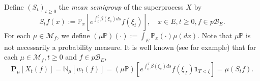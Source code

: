 \documentclass[UTF8]{pkuthss}
\theoremstyle{plain}
\theoremstyle{definition}
\numberwithin{equation}{section}
\begin{document}
	Define $(S_t)_{t \geq 0}$ the \emph{mean semigroup} of the superprocess $X$ by
\begin{equation}
\label{eq: mean semigroup}
	S_t f(x)
	:= \mathbb P_x[e^{\int_0^t \beta(\xi_s) ds} f(\xi_t)],
	\quad x \in E,t \geq 0,f \in p\mathscr B_E.
\end{equation}
	For each $\mu \in \mathcal M_f$, we define $ (\mu\mathbb P)(\cdot):= \int_E \mathbb P_x(\cdot)\mu(dx)$.
	Note that $\mu\mathbb P$ is not necessarily a probability measure.
	It is well known (see \cite[Proposition 2.27]{Li2011Measure-valued} for example) that for each $\mu \in \mathcal M_f, t \geq 0$ and $f \in p\mathscr B_E,$
\begin{equation}
\label{eq: mean formula}
	\mathbf P_\mu[X_t(f)]
	= \mathbb N_\mu[w_t(f)]
	= (\mu\mathbb P)[e^{\int_0^T \beta(\xi_s)ds}f(\xi_T)\mathbf 1_{T<\zeta}]
	=\mu(S_t f).
\end{equation}
\end{document}
